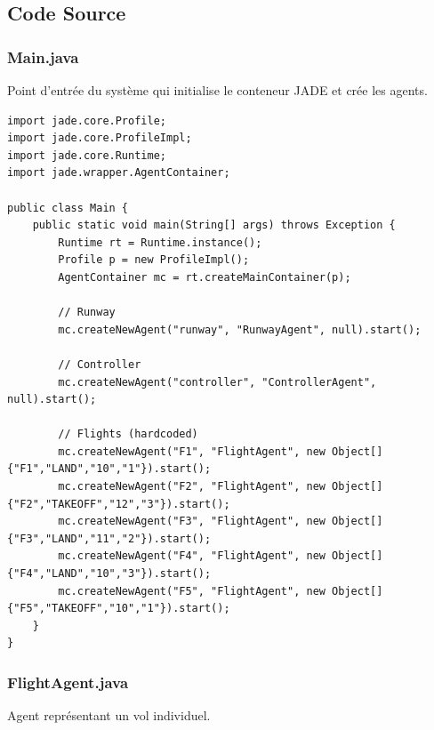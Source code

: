 \documentclass[12pt,a4paper]{article}
\begin{document}
\subsection{Code Source}

\subsubsection{Main.java}

Point d'entrée du système qui initialise le conteneur JADE et crée les agents.

\begin{lstlisting}[caption=Main.java]
import jade.core.Profile;
import jade.core.ProfileImpl;
import jade.core.Runtime;
import jade.wrapper.AgentContainer;

public class Main {
    public static void main(String[] args) throws Exception {
        Runtime rt = Runtime.instance();
        Profile p = new ProfileImpl();
        AgentContainer mc = rt.createMainContainer(p);

        // Runway
        mc.createNewAgent("runway", "RunwayAgent", null).start();

        // Controller
        mc.createNewAgent("controller", "ControllerAgent", null).start();

        // Flights (hardcoded)
        mc.createNewAgent("F1", "FlightAgent", new Object[]{"F1","LAND","10","1"}).start();
        mc.createNewAgent("F2", "FlightAgent", new Object[]{"F2","TAKEOFF","12","3"}).start();
        mc.createNewAgent("F3", "FlightAgent", new Object[]{"F3","LAND","11","2"}).start();
        mc.createNewAgent("F4", "FlightAgent", new Object[]{"F4","LAND","10","3"}).start();
        mc.createNewAgent("F5", "FlightAgent", new Object[]{"F5","TAKEOFF","10","1"}).start();
    }
}
\end{lstlisting}

\subsubsection{FlightAgent.java}

Agent représentant un vol individuel.
\end{document}
